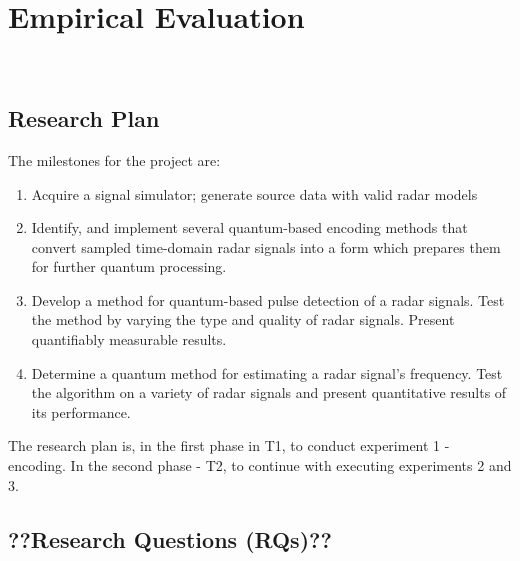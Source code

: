 \section{Empirical Evaluation}~\label{sec:evaluation}

\subsection{Research Plan}

The milestones for the project are:
\begin{enumerate}
    \item Acquire a signal simulator; generate source data with valid radar models
    \item Identify, and implement several quantum-based encoding methods that convert sampled time-domain radar signals into a form which prepares them for further quantum processing.
    \item Develop a method for quantum-based pulse detection of a radar signals. Test the method by varying the type and quality of radar signals. Present quantifiably measurable results.
    \item Determine a quantum method for estimating a radar signal’s frequency. Test the algorithm on a variety of radar signals and present quantitative results of its performance.
\end{enumerate}

The research plan is, in the first phase in T1, to conduct experiment 1 - encoding. In the second phase - T2, to continue with executing experiments 2 and 3.


\subsection{??Research Questions (RQs)??}~\label{subsec:RQs}